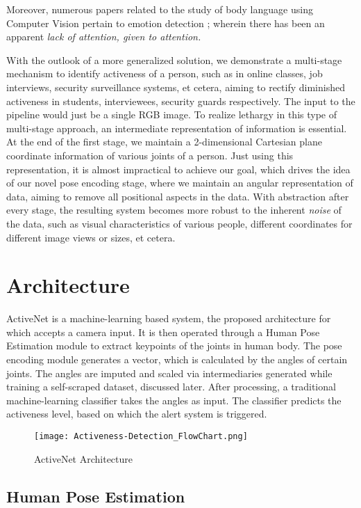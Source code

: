 \documentclass[sigconf]{acmart}
\begin{document}
Moreover, numerous papers related to the study of body language using Computer Vision pertain to emotion detection \cite{article}; wherein there has been an apparent \textit{lack of attention, given to attention.}

With the outlook of a more generalized solution, we demonstrate a multi-stage mechanism to identify activeness of a person, such as in online classes, job interviews, security surveillance systems, et cetera, aiming to rectify diminished activeness in students, interviewees, security guards respectively. The input to the pipeline would just be a single RGB image. To realize lethargy in this type of multi-stage approach, an intermediate representation of information is essential. At the end of the first stage, we maintain a 2-dimensional Cartesian plane coordinate information of various joints of a person. Just using this representation, it is almost impractical to achieve our goal, which drives the idea of our novel pose encoding stage, where we maintain an angular representation of data, aiming to remove all positional aspects in the data. With abstraction after every stage, the resulting system becomes more robust to the inherent \textit{noise} of the data, such as visual characteristics of various people, different coordinates for different image views or sizes, et cetera.

\section{Architecture}
ActiveNet is a machine-learning based system, the proposed architecture for which accepts a camera input. It is then operated through a Human Pose Estimation module to extract keypoints of the joints in human body. The pose encoding module generates a vector, which is calculated by the angles of certain joints. The angles are imputed and scaled via intermediaries generated while training a self-scraped dataset, discussed later. After processing, a traditional machine-learning classifier takes the angles as input. The classifier predicts the activeness level, based on which the alert system is triggered.

\begin{figure*}[ht]
\centering
\texttt{[image: Activeness-Detection\_FlowChart.png]}
\vspace{-0.25cm}
\caption{ActiveNet Architecture}
\label{Fig1}
\end{figure*}

\subsection{Human Pose Estimation}\label{hpe}
\end{document}
